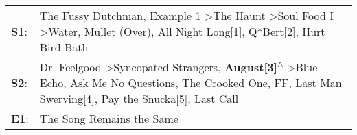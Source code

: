 \begin{supertabular}{p{0.03\textwidth}p{0.92\textwidth}}
 \textbf{S1}:  &                                                               The Fussy Dutchman\textsuperscript{}, \enspace Example 1\textsuperscript{} \textgreater \enspace The Haunt\textsuperscript{} \textgreater \enspace Soul Food I\textsuperscript{} \textgreater \enspace Water\textsuperscript{}, \enspace Mullet (Over)\textsuperscript{}, \enspace All Night Long[1]\textsuperscript{}, \enspace Q*Bert[2]\textsuperscript{}, \enspace Hurt Bird Bath\textsuperscript{}  \enspace  \\
 \textbf{S2}:  &  Dr. Feelgood\textsuperscript{} \textgreater \enspace Syncopated Strangers\textsuperscript{}, \enspace \textbf{August[3]\textsuperscript{$\wedge$}} \textgreater \enspace Blue Echo\textsuperscript{}, \enspace Ask Me No Questions\textsuperscript{}, \enspace The Crooked One\textsuperscript{}, \enspace FF\textsuperscript{}, \enspace Last Man Swerving[4]\textsuperscript{}, \enspace Pay the Snucka[5]\textsuperscript{}, \enspace Last Call\textsuperscript{}  \enspace  \\
 \textbf{E1}:  &                                                                                                                                                                                                                                                                                                                                                                                                                           The Song Remains the Same\textsuperscript{}  \enspace  \\
\end{supertabular}
